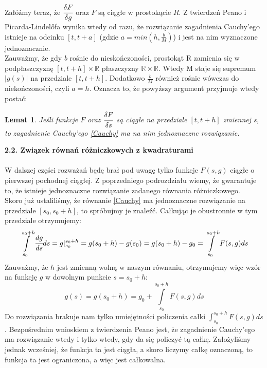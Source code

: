 \documentclass[a4paper]{article}
\newtheorem{theorem}{Lemat}
\begin{document}
Załóżmy teraz, że $\cfrac{\delta F}{\delta g}$ oraz $F$ są ciągłe w prostokącie $R$. Z twierdzeń Peano i Picarda-Lindel{\H o}fa wynika wtedy od razu, że rozwiązanie zagadnienia Cauchy'ego istnieje na odcinku $[t, t+a]$ (gdzie $a = min(h, \frac{b}{M})$) i jest na nim wyznaczone jednoznacznie. \cite{UW}\\

Zauważmy, że gdy $b$ rośnie do nieskończoności, prostokąt R zamienia się w podpłaszczyznę $[t, t+h] \times \mathbb{R}$ płaszczyzny $\mathbb{R} \times \mathbb{R}$. Wtedy M staje się supremum $|g(s)|$ na przedziale $[t, t+h]$. Dodatkowo $\frac{b}{M}$ również rośnie wówczas do niekończoności, czyli $a = h$. Oznacza to, że powyższy argument przyjmuje wtedy postać:
\begin{theorem}
Jeśli funkcje $F$ oraz $\cfrac{\delta F}{\delta s}$ są ciągłe na przedziale $[t, t+h]$ zmiennej s, to zagadnienie Cauchy'ego \eqref{Cauchy} ma na nim jednoznaczne rozwiązanie.
\end{theorem}

\large
\textbf{2.2. Związek równań różniczkowych z kwadraturami}\\\\
\normalsize
W dalszej części rozważań będę brał pod uwagę tylko funkcje $F(s,g)$ ciągłe o pierwszej pochodnej ciągłej. Z poprzedniego podrozdziału wiemy, że gwarantuje to, że istnieje jednoznaczne rozwiązanie zadanego równania różniczkowego.\\
Skoro już ustaliliśmy, że równanie \eqref{Cauchy} ma jednoznaczne rozwiązanie na przedziale $[s_0, s_0+h]$, to spróbujmy je znaleźć. Całkując je obustronnie w tym przedziale otrzymujemy:
$$\int\limits_{s_0}^{s_0+h} \cfrac{dg}{ds} ds = g|_{s_0}^{s_0+h} = g(s_0+h) - g(s_0) = g(s_0+h) - g_0 = \int\limits_{s_0}^{s_0+h} F(s,g) ds$$
Zauważmy, że $h$ jest zmienną wolną w naszym równaniu, otrzymujemy więc wzór na funkcję $g$ w dowolnym punkcie $s = s_0 + h$:
\begin{equation}\label{eq}
g(s) = g(s_0+h) = g_0 + \int\limits_{s_0}^{s_0+h} F(s,g) ds
\end{equation}
Do rozwiązania brakuje nam tylko umiejętności policzenia całki $\int_{s_0}^{s_0+h} F(s,g) ds$. Bezpośrednim wnioskiem z twierdzenia Peano jest, że zagadnienie Cauchy'ego ma rozwiązanie wtedy i tylko wtedy, gdy da się policzyć tą całkę. Założyliśmy jednak wcześniej, że funkcja ta jest ciągła, a skoro liczymy całkę oznaczoną, to funkcja ta jest ograniczona, a więc jest całkowalna.\\
\end{document}
